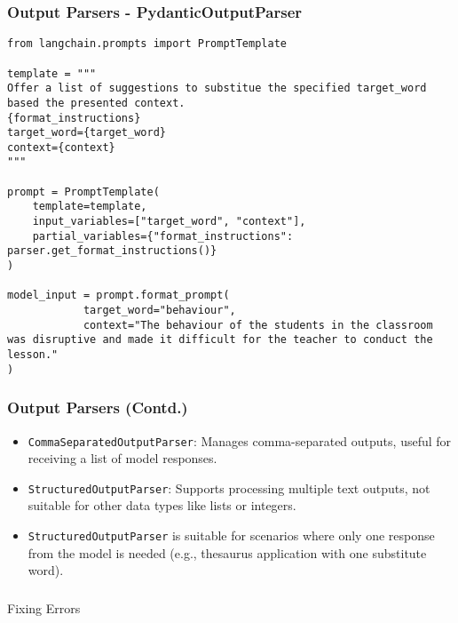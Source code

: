 \begin{frame}[fragile]
\frametitle{Output Parsers - PydanticOutputParser}

\begin{lstlisting}
from langchain.prompts import PromptTemplate

template = """
Offer a list of suggestions to substitue the specified target_word based the presented context.
{format_instructions}
target_word={target_word}
context={context}
"""

prompt = PromptTemplate(
    template=template,
    input_variables=["target_word", "context"],
    partial_variables={"format_instructions": parser.get_format_instructions()}
)

model_input = prompt.format_prompt(
			target_word="behaviour",
			context="The behaviour of the students in the classroom was disruptive and made it difficult for the teacher to conduct the lesson."
)
\end{lstlisting}

\end{frame}

\begin{frame}[fragile]
\frametitle{Output Parsers (Contd.)}

\begin{itemize}
    \item  \texttt{CommaSeparatedOutputParser}: Manages comma-separated outputs, useful for receiving a list of model responses.
    \item  \texttt{StructuredOutputParser}: Supports processing multiple text outputs, not suitable for other data types like lists or integers.
    \item \texttt{StructuredOutputParser} is suitable for scenarios where only one response from the model is needed (e.g., thesaurus application with one substitute word).
\end{itemize}

\end{frame}

\begin{frame}[fragile]\frametitle{}
\begin{center}
{\Large Fixing Errors}
\end{center}
\end{frame}

